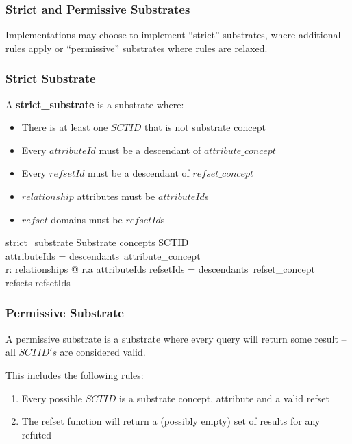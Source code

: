 \documentclass{article}
\begin{document}
\subsubsection{Strict and Permissive Substrates}
Implementations may choose to implement ``strict'' substrates, where additional rules apply or ``permissive'' substrates where rules are relaxed.
\subsubsection{Strict Substrate}
A \textbf{strict\_substrate} is a substrate where:
\begin{itemize}[noitemsep,nolistsep]
\item There is at least one $SCTID$ that is not substrate concept 
\item Every $attributeId$ must be a descendant of $attribute\_concept$
\item Every $refsetId$ must be a descendant of $refset\_concept$
\item $relationship$ attributes must be $attributeId$s
\item $refset$ domains must be $refsetId$s 
\end{itemize}

\begin{schema}{strict\_substrate}
    Substrate
 \where
     concepts \subset SCTID \\
     attributeIds =  descendants~attribute\_concept \\
     \forall r: relationships @ r.a \in attributeIds
\also
    refsetIds = descendants~refset\_concept \\
    \dom refsets \subseteq refsetIds
 \end{schema}
 
 \subsubsection{Permissive Substrate}
 A permissive substrate is a substrate where every query will return some result -- all $SCTID's$ are considered valid.
 
 This includes the following rules:
 \begin{enumerate}
 \item Every possible $SCTID$ is a substrate concept, attribute and a valid refset
 \item The refset function will return a (possibly empty) set of results for any refuted
 \end{enumerate}
 
\end{document}
